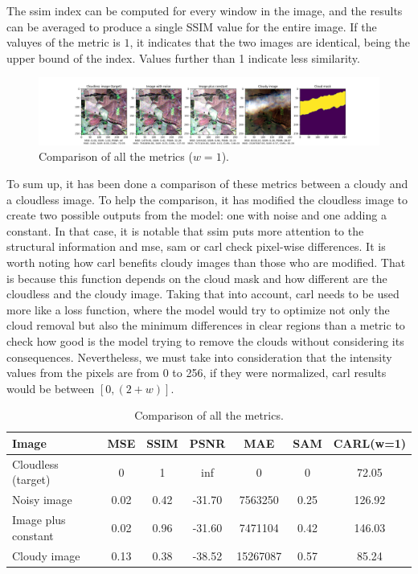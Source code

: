 The \gls{ssim} index can be computed for every window in the image, and the results can be averaged to produce a single SSIM value for the entire image. If the valuyes of the metric is $1$, it indicates that the two images are identical, being the upper bound of the index. Values further than 1 indicate less similarity.
\begin{figure}[H]
	\centering
	\begin{adjustwidth}{-5cm}{}
		\includegraphics[width=24cm]{imgs/models/metrics/approach}
	\end{adjustwidth}
	\caption{Comparison of all the metrics ($w=1$).}
	\label{fig:models-metrics-comparison}
\end{figure}
To sum up, it has been done a comparison of these metrics between a cloudy and a cloudless image. To help the comparison, it has modified the cloudless image to create two possible outputs from the model: one with noise and one adding a constant. In that case, it is notable that \gls{ssim} puts more attention to the structural information and \gls{mse}, \gls{sam} or \gls{carl} check pixel-wise differences. It is worth noting how \gls{carl} benefits cloudy images than those who are modified. That is because this function depends on the cloud mask and how different are the cloudless and the cloudy image. Taking that into account, \gls{carl} needs to be used more like a loss function, where the model would try to optimize not only the cloud removal but also the minimum differences in clear regions than a metric to check how good is the model trying to remove the clouds without considering its consequences. Nevertheless, we must take into consideration that the intensity values from the pixels are from 0 to 256, if they were normalized, \gls{carl} results would be between $[0, (2 + w)]$.
\begin{table}[H]
	\caption{Comparison of all the metrics.}
	\begin{tabular}{l|cccccc}
		Image & MSE & SSIM & PSNR & MAE & SAM & CARL(w=1)\\\hline
		Cloudless (target) & 0 & 1 & inf & 0 & 0 & 72.05\\
		Noisy image & 0.02 & 0.42 &  -31.70 & 7563250 & 0.25 & 126.92\\
		Image plus constant & 0.02 & 0.96 & -31.60 & 7471104 & 0.42 & 146.03\\
		Cloudy image & 0.13 & 0.38 & -38.52 & 15267087 & 0.57 & 85.24\\
	\end{tabular}
\end{table}

